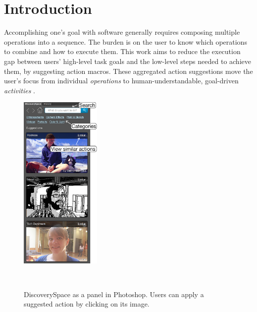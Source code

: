 \section{Introduction}

Accomplishing one's goal with software generally requires composing multiple operations into a sequence. The burden is on the user to know which operations to combine and how to execute them. This work aims to reduce the execution gap between users' high-level task goals and the low-level steps needed to achieve them, by suggesting action macros. These aggregated action suggestions move the user's focus from individual \textit{operations} to human-understandable, goal-driven \textit{activities} \cite{Li2008, Gay2004}.

\begin{figure}[b!]
\centering
  \includegraphics[width=0.35\textwidth]{discoveryspace/figures/discoveryspace_with_labels.png}
  \caption{DiscoverySpace as a panel in Photoshop. Users can apply a suggested action by clicking on its image.}~\label{fig:discoveryspace_interface}
\end{figure}

